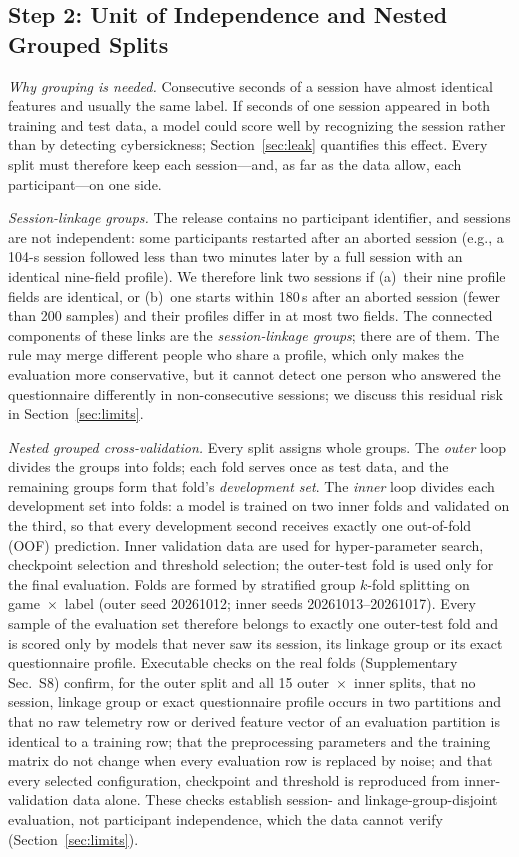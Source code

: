 \subsection{Step 2: Unit of Independence and Nested Grouped Splits}
\label{sec:groups}
\emph{Why grouping is needed.} Consecutive seconds of a session have almost identical features and usually the same label. If seconds of one session appeared in both training and test data, a model could score well by recognizing the session rather than by detecting cybersickness; Section~\ref{sec:leak} quantifies this effect. Every split must therefore keep each session---and, as far as the data allow, each participant---on one side.

\emph{Session-linkage groups.} The release contains no participant identifier, and sessions are not independent: some participants restarted after an aborted session (e.g., a 104-s session followed less than two minutes later by a full session with an identical nine-field profile). We therefore link two sessions if (a)~their nine profile fields are identical, or (b)~one starts within 180\,s after an aborted session (fewer than 200 samples) and their profiles differ in at most two fields. The connected components of these links are the \emph{session-linkage groups}; there are \nGroupsEval{} of them. The rule may merge different people who share a profile, which only makes the evaluation more conservative, but it cannot detect one person who answered the questionnaire differently in non-consecutive sessions; we discuss this residual risk in Section~\ref{sec:limits}.

\emph{Nested grouped cross-validation.} Every split assigns whole groups. The \emph{outer} loop divides the groups into \nOuter{} folds; each fold serves once as test data, and the remaining groups form that fold's \emph{development set}. The \emph{inner} loop divides each development set into \nInner{} folds: a model is trained on two inner folds and validated on the third, so that every development second receives exactly one out-of-fold (OOF) prediction. Inner validation data are used for hyper-parameter search, checkpoint selection and threshold selection; the outer-test fold is used only for the final evaluation. Folds are formed by stratified group $k$-fold splitting on game~$\times$~label (outer seed 20261012; inner seeds 20261013--20261017). Every sample of the evaluation set therefore belongs to exactly one outer-test fold and is scored only by models that never saw its session, its linkage group or its exact questionnaire profile. Executable checks on the real folds (Supplementary Sec.~S8) confirm, for the outer split and all 15 outer~$\times$~inner splits, that no session, linkage group or exact questionnaire profile occurs in two partitions and that no raw telemetry row or derived feature vector of an evaluation partition is identical to a training row; that the preprocessing parameters and the training matrix do not change when every evaluation row is replaced by noise; and that every selected configuration, checkpoint and threshold is reproduced from inner-validation data alone. These checks establish session- and linkage-group-disjoint evaluation, not participant independence, which the data cannot verify (Section~\ref{sec:limits}).

